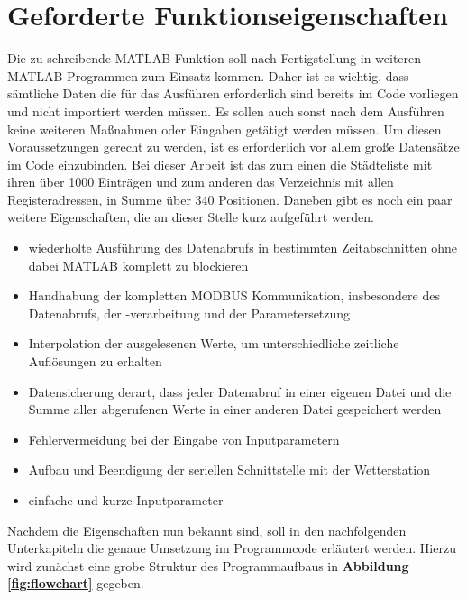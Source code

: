 \section{Geforderte Funktionseigenschaften}
Die zu schreibende MATLAB Funktion soll nach Fertigstellung in weiteren MATLAB Programmen zum Einsatz kommen. Daher ist es wichtig, dass sämtliche Daten die für das Ausführen erforderlich sind bereits im Code vorliegen und nicht importiert werden müssen. Es sollen auch sonst nach dem Ausführen keine weiteren Maßnahmen oder Eingaben getätigt werden müssen. Um diesen Voraussetzungen gerecht zu werden, ist es erforderlich vor allem große Datensätze im Code einzubinden.\label{createstruct} Bei dieser Arbeit ist das zum einen die Städteliste mit ihren über 1000 Einträgen und zum anderen das Verzeichnis mit allen Registeradressen, in Summe über 340 Positionen. Daneben gibt es noch ein paar weitere Eigenschaften, die an dieser Stelle kurz aufgeführt werden.
\begin{itemize}
\item wiederholte Ausführung des Datenabrufs in bestimmten Zeitabschnitten ohne dabei MATLAB komplett zu blockieren
\item Handhabung der kompletten MODBUS Kommunikation, insbesondere des Datenabrufs, der -verarbeitung und der Parametersetzung
\item Interpolation der ausgelesenen Werte, um unterschiedliche zeitliche Auflösungen zu erhalten
\item Datensicherung derart, dass jeder Datenabruf in einer eigenen Datei und die Summe aller abgerufenen Werte in einer anderen Datei gespeichert werden
\item Fehlervermeidung bei der Eingabe von Inputparametern
\item Aufbau und Beendigung der seriellen Schnittstelle mit der Wetterstation
\item einfache und kurze Inputparameter
\end{itemize}
Nachdem die Eigenschaften nun bekannt sind, soll in den nachfolgenden Unterkapiteln die genaue Umsetzung im Programmcode erläutert werden. Hierzu wird zunächst eine grobe Struktur des Programmaufbaus in \textbf{Abbildung \ref{fig:flowchart}} gegeben. 
